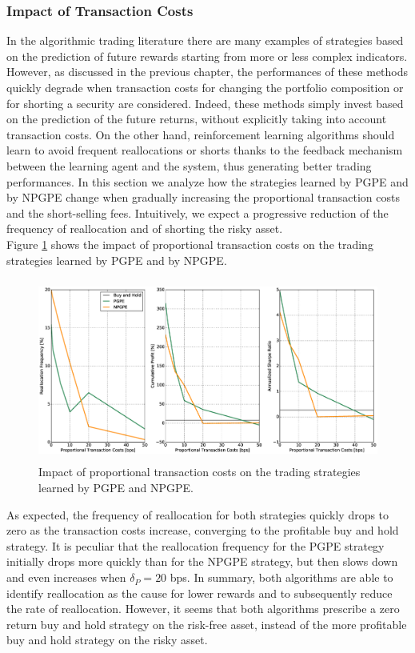 \subsubsection{Impact of Transaction Costs}
In the algorithmic trading literature there are many examples of strategies based on the prediction of future rewards starting from more or less complex indicators. However, as discussed in the previous chapter, the performances of these methods quickly degrade when transaction costs for changing the portfolio composition or for shorting a security are considered. Indeed, these methods simply invest based on the prediction of the future returns, without explicitly taking into account transaction costs. On the other hand, reinforcement learning algorithms should learn to avoid frequent reallocations or shorts thanks to the feedback mechanism between the learning agent and the system, thus generating better trading performances. In this section we analyze how the strategies learned by PGPE and by NPGPE change when gradually increasing the proportional transaction costs and the short-selling fees. Intuitively, we expect a progressive reduction of the frequency of reallocation and of shorting the risky asset.\\
Figure \ref{fig:impact_transaction_costs} shows the impact of proportional transaction costs on the trading strategies learned by PGPE and by NPGPE. 
\begin{figure}[t!]
	\centering
	\includegraphics[height=6cm,width=1.0\textwidth]{Images/6_2_impact_transaction_costs}
	\caption[Proportional transaction costs and risk-neutral strategies]{Impact of proportional transaction costs on the trading strategies learned by PGPE and NPGPE.}
	\label{fig:impact_transaction_costs}
\end{figure}
As expected, the frequency of reallocation for both strategies quickly drops to zero as the transaction costs increase, converging to the profitable buy and hold strategy. It is peculiar that the reallocation frequency for the PGPE strategy initially drops more quickly than for the NPGPE strategy, but then slows down and even increases when $\delta_P = 20$ bps. In summary, both algorithms are able to identify reallocation as the cause for lower rewards and to subsequently reduce the rate of reallocation. However, it seems that both algorithms prescribe a zero return buy and hold strategy on the risk-free asset, instead of the more profitable buy and hold strategy on the risky asset.\\
